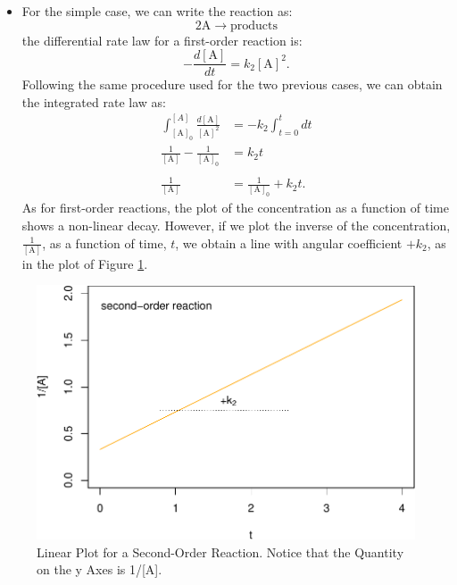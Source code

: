 \documentclass[
  9pt,
]{extbook}
\providecommand{\tightlist}{%
  \setlength{\itemsep}{0pt}\setlength{\parskip}{0pt}}
\theoremstyle{definition}
\theoremstyle{definition}
\theoremstyle{definition}
\theoremstyle{definition}
\theoremstyle{remark}
\begin{document}
\begin{itemize}
\tightlist
\item
  For the simple case, we can write the reaction as:
  \begin{equation}
  2\mathrm{A}\rightarrow \text{products}
  \end{equation}
  the differential rate law for a first-order reaction is:
  \begin{equation}
  -\frac{d[\mathrm{A}]}{dt}=k_2 [\mathrm{A}]^2.
  \label{eq:kin10}
  \end{equation}
  Following the same procedure used for the two previous cases, we can obtain the integrated rate law as:
  \begin{equation}
  \begin{aligned}
  \int_{[\mathrm{A}]_0}^{[A]} \frac{d[\mathrm{A}]}{[\mathrm{A}]^2} &= -k_2 \int_{t=0}^{t} dt \\
  \frac{1}{[\mathrm{A}]}-\frac{1}{[\mathrm{A}]_0} &= k_2 t\\ \\
  \frac{1}{[\mathrm{A}]}&=\frac{1}{[\mathrm{A}]_0} + k_2 t.
  \end{aligned}
  \label{eq:kin11}
  \end{equation}
  As for first-order reactions, the plot of the concentration as a function of time shows a non-linear decay. However, if we plot the inverse of the concentration, \(\frac{1}{[\mathrm{A}]}\), as a function of time, \(t\), we obtain a line with angular coefficient \(+k_2\), as in the plot of Figure \ref{fig:figk4}.
\end{itemize}

\begin{figure}

{\centering \includegraphics{pchem1_files/figure-latex/figk4-1} 

}

\caption{Linear Plot for a Second-Order Reaction. Notice that the Quantity on the y Axes is 1/[A].}\label{fig:figk4}
\end{figure}
\end{document}
